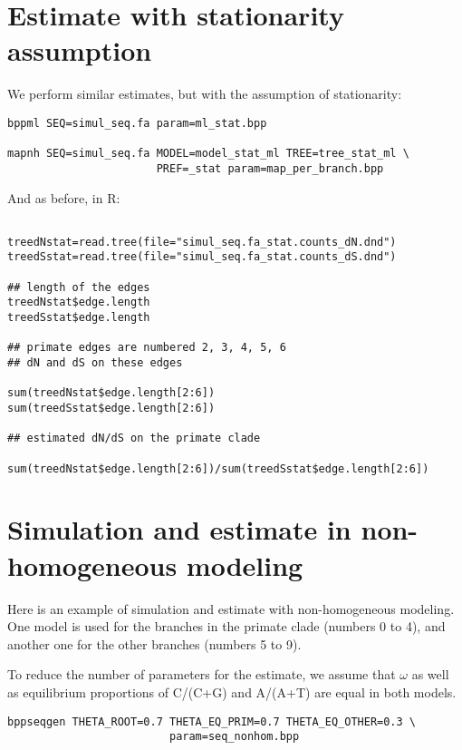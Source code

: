 \documentclass[11pt, a4paper]{article}
\begin{document}
{\section*{Estimate with stationarity assumption}

We perform similar estimates, but with the assumption of
stationarity:

\begin{verbatim}
bppml SEQ=simul_seq.fa param=ml_stat.bpp

mapnh SEQ=simul_seq.fa MODEL=model_stat_ml TREE=tree_stat_ml \
                       PREF=_stat param=map_per_branch.bpp

\end{verbatim}

And as before, in R:

\begin{verbatim}

treedNstat=read.tree(file="simul_seq.fa_stat.counts_dN.dnd")  
treedSstat=read.tree(file="simul_seq.fa_stat.counts_dS.dnd")  

## length of the edges 
treedNstat$edge.length
treedSstat$edge.length

## primate edges are numbered 2, 3, 4, 5, 6
## dN and dS on these edges

sum(treedNstat$edge.length[2:6])
sum(treedSstat$edge.length[2:6])

## estimated dN/dS on the primate clade

sum(treedNstat$edge.length[2:6])/sum(treedSstat$edge.length[2:6])

\end{verbatim}


\section*{Simulation and estimate in non-homogeneous modeling}

Here is an example of simulation and estimate with non-homogeneous
modeling. One model is used for the branches in the primate clade
(numbers 0 to 4), and another one for the other branches (numbers 5 to
9).

To reduce the number of parameters for the estimate, we assume that
$\omega$ as well as equilibrium proportions of C/(C+G) and A/(A+T) are
equal in both models.

\begin{verbatim}
bppseqgen THETA_ROOT=0.7 THETA_EQ_PRIM=0.7 THETA_EQ_OTHER=0.3 \
                         param=seq_nonhom.bpp


\end{verbatim}}
\end{document}
